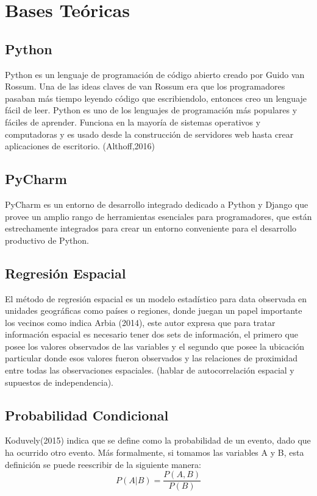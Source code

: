 \section{Bases Te\'oricas}

\subsection{Python}

Python es un lenguaje de programación de código abierto creado por Guido van Rossum. Una de las ideas claves de van Rossum era que los programadores pasaban más tiempo leyendo código que escribiendolo, entonces creo un lenguaje fácil de leer. Python es uno de los lenguajes de programación más populares y fáciles de aprender. Funciona en la mayoría de sistemas operativos y computadoras y es usado desde la construcción de servidores web hasta crear aplicaciones de escritorio. (Althoff,2016)

\subsection{PyCharm}
PyCharm es un entorno de desarrollo integrado dedicado a Python y Django que provee un amplio rango de herramientas esenciales para programadores, que están estrechamente integrados para crear un entorno conveniente para el desarrollo productivo de Python.

\subsection{Regresión Espacial}

El método de regresión espacial es un modelo estadístico para data observada en unidades geográficas como países o regiones, donde juegan un papel importante los vecinos como indica Arbia (2014), este autor expresa que para tratar información espacial es necesario tener dos sets de información, el primero que posee los valores observados de las variables y el segundo que posee la ubicación particular donde esos valores fueron observados y las relaciones de proximidad entre todas las observaciones espaciales. (hablar de autocorrelación espacial y supuestos de independencia).

\subsection{Probabilidad Condicional}

Koduvely(2015) indica que se define como la probabilidad de un evento, dado que ha ocurrido otro evento. Más formalmente, si tomamos las variables A y B, esta definición se puede reescribir de la siguiente manera:
	\[P\left(A|B\right)=\frac{P\left(A,B\right)}{P\left(B\right)}
\]

